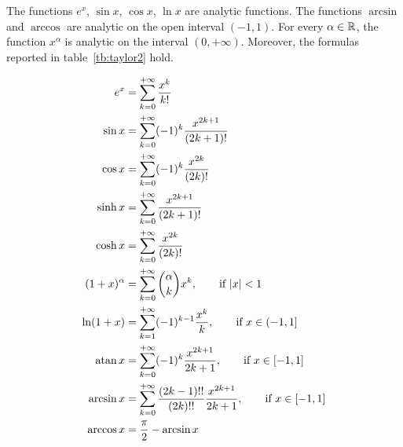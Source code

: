 \begin{theorem}
  \label{th:serie_taylor}
    The functions $e^x$, $\sin x$, $\cos x$, $\ln x$ are analytic functions. The
  functions $\arcsin$ and $\arccos$ are analytic on the open interval $(-1,1)$.
  For every $\alpha \in {\mathbb R}$, the function $x^\alpha$ is analytic on the
  interval $(0,+\infty)$. Moreover, the formulas reported in
  table~\ref{tb:taylor2} hold.
\end{theorem}
%
\begin{table}
\begin{align*}
e^x &= \sum_{k=0}^{+\infty} \frac{x^k}{k!}\\
\sin x &= \sum_{k=0}^{+\infty} (-1)^k\frac{x^{2k+1}}{(2k+1)!}\\
\cos x &= \sum_{k=0}^{+\infty} (-1)^k\frac{x^{2k}}{(2k)!}\\
\sinh x &= \sum_{k=0}^{+\infty} \frac{x^{2k+1}}{(2k+1)!}\\
\cosh x &= \sum_{k=0}^{+\infty} \frac{x^{2k}}{(2k)!} \\
(1+x)^\alpha &= \sum_{k=0}^{+\infty} {\alpha \choose k} x^k, \qquad \text{if
${\left|x\right|}<1$} \\
\ln (1+x) &= \sum_{k=1}^{+\infty} (-1)^{k-1} \frac{x^k}{k}, \qquad \text{if $x\in(-1,1]$} \\
\operatorname{atan} x &= \sum_{k=0}^{+\infty} (-1)^k \frac{x^{2k+1}}{2k+1}, \qquad \text{if $x\in [-1,1]$} \\
\arcsin x &= \sum_{k=0}^{+\infty} \frac{(2k-1)!!}{(2k)!!} \frac{x^{2k+1}}{2k+1}, 
  \qquad \text{if $x\in[-1,1]$} \\
\arccos x &= \frac \pi 2 - \arcsin x
\end{align*}
\caption{Taylor series expansions of some elementary functions.
%
%
See theorem~\ref{th:serie_taylor}.}
\label{tb:taylor2}%
\end{table}
%
